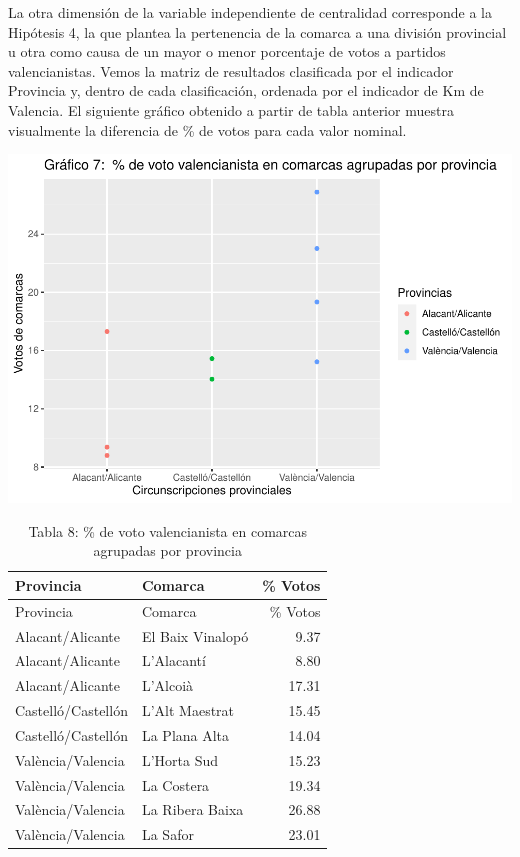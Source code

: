 \documentclass[
]{article}
\begin{document}
La otra dimensión de la variable independiente de centralidad
corresponde a la Hipótesis 4, la que plantea la pertenencia de la
comarca a una división provincial u otra como causa de un mayor o menor
porcentaje de votos a partidos valencianistas. Vemos la matriz de
resultados clasificada por el indicador Provincia y, dentro de cada
clasificación, ordenada por el indicador de Km de Valencia. El siguiente
gráfico obtenido a partir de tabla anterior muestra visualmente la
diferencia de \% de votos para cada valor nominal.

\includegraphics[width=0.8\linewidth,height=0.8\textheight]{votovalencianista-ea2023_page_files/figure-latex/funcionesGrafico2-1}

\begin{longtable}[]{@{}llr@{}}
\caption{Tabla 8: \% de voto valencianista en comarcas agrupadas por
provincia}\tabularnewline
\toprule\noalign{}
Provincia & Comarca & \% Votos \\
\midrule\noalign{}
\endfirsthead
\toprule\noalign{}
Provincia & Comarca & \% Votos \\
\midrule\noalign{}
\endhead
\bottomrule\noalign{}
\endlastfoot
Alacant/Alicante & El Baix Vinalopó & 9.37 \\
Alacant/Alicante & L'Alacantí & 8.80 \\
Alacant/Alicante & L'Alcoià & 17.31 \\
Castelló/Castellón & L'Alt Maestrat & 15.45 \\
Castelló/Castellón & La Plana Alta & 14.04 \\
València/Valencia & L'Horta Sud & 15.23 \\
València/Valencia & La Costera & 19.34 \\
València/Valencia & La Ribera Baixa & 26.88 \\
València/Valencia & La Safor & 23.01 \\
\end{longtable}
\end{document}
